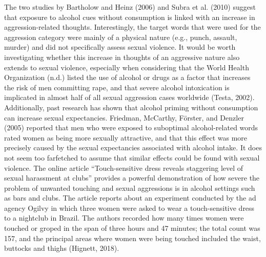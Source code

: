 \documentclass[authordate, serif, review]{jote-article}
\begin{document}
\begin{multicols}{2}
The two studies by Bartholow and Heinz (2006) and Subra et al. (2010) suggest that exposure to alcohol cues without consumption is linked with an increase in aggression-related thoughts. Interestingly, the target words that were used for the aggression category were mainly of a physical nature (e.g., punch, assault, murder) and did not specifically assess sexual violence. It would be worth investigating whether this increase in thoughts of an aggressive nature also extends to sexual violence, especially when considering that the World Health Organization (n.d.) listed the use of alcohol or drugs as a factor that increases the risk of men committing rape, and that severe alcohol intoxication is implicated in almost half of all sexual aggression cases worldwide (Testa, 2002). Additionally, past research has shown that alcohol priming without consumption can increase sexual expectancies. Friedman, McCarthy, F\"{o}rster, and Denzler (2005) reported that men who were exposed to suboptimal alcohol-related words rated women as being more sexually attractive, and that this effect was more precisely caused by the sexual expectancies associated with alcohol intake. It does not seem too farfetched to assume that similar effects could be found with sexual violence. The online article ``Touch-sensitive dress reveals staggering level of sexual harassment at clubs'' provides a powerful demonstration of how severe the problem of unwanted touching and sexual aggressions is in alcohol settings such as bars and clubs. The article reports about an experiment conducted by the ad agency Ogilvy in which three women were asked to wear a touch-sensitive dress to a nightclub in Brazil. The authors recorded how many times women were touched or groped in the span of three hours and 47 minutes; the total count was 157, and the principal areas where women were being touched included the waist, buttocks and thighs (Hignett, 2018).


\end{multicols}
\end{document}
